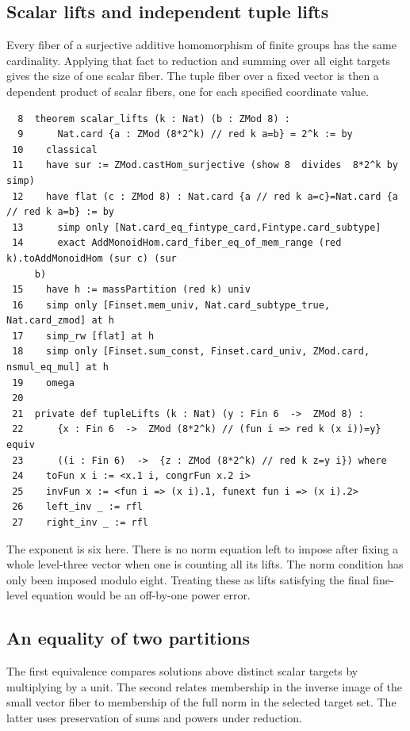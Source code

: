 \documentclass[12pt,letterpaper]{article}
\begin{document}
\clearpage{}\subsection*{Scalar lifts and independent tuple lifts}
Every fiber of a surjective additive homomorphism of finite groups has the same cardinality. Applying that fact to reduction and summing over all eight targets gives the size of one scalar fiber. The tuple fiber over a fixed vector is then a dependent product of scalar fibers, one for each specified coordinate value.
\par
{\fontsize{8.8}{10.5}\selectfont\begin{verbatim}
  8  theorem scalar_lifts (k : Nat) (b : ZMod 8) :
  9      Nat.card {a : ZMod (8*2^k) // red k a=b} = 2^k := by
 10    classical
 11    have sur := ZMod.castHom_surjective (show 8  divides  8*2^k by simp)
 12    have flat (c : ZMod 8) : Nat.card {a // red k a=c}=Nat.card {a // red k a=b} := by
 13      simp only [Nat.card_eq_fintype_card,Fintype.card_subtype]
 14      exact AddMonoidHom.card_fiber_eq_of_mem_range (red k).toAddMonoidHom (sur c) (sur
     b)
 15    have h := massPartition (red k) univ
 16    simp only [Finset.mem_univ, Nat.card_subtype_true, Nat.card_zmod] at h
 17    simp_rw [flat] at h
 18    simp only [Finset.sum_const, Finset.card_univ, ZMod.card, nsmul_eq_mul] at h
 19    omega
 20  
 21  private def tupleLifts (k : Nat) (y : Fin 6  ->  ZMod 8) :
 22      {x : Fin 6  ->  ZMod (8*2^k) // (fun i => red k (x i))=y}  equiv
 23      ((i : Fin 6)  ->  {z : ZMod (8*2^k) // red k z=y i}) where
 24    toFun x i := <x.1 i, congrFun x.2 i>
 25    invFun x := <fun i => (x i).1, funext fun i => (x i).2>
 26    left_inv _ := rfl
 27    right_inv _ := rfl
\end{verbatim}}
The exponent is six here. There is no norm equation left to impose after fixing a whole level-three vector when one is counting all its lifts. The norm condition has only been imposed modulo eight. Treating these as lifts satisfying the final fine-level equation would be an off-by-one power error.
\clearpage{}\subsection*{An equality of two partitions}
The first equivalence compares solutions above distinct scalar targets by multiplying by a unit. The second relates membership in the inverse image of the small vector fiber to membership of the full norm in the selected target set. The latter uses preservation of sums and powers under reduction.
\end{document}
